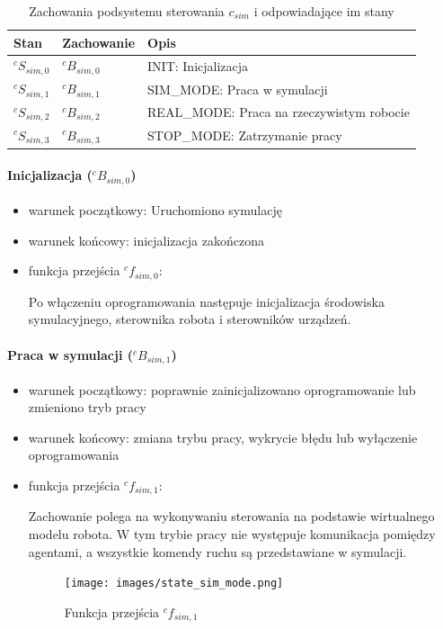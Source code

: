 \documentclass[a4paper, 12pt, twoside]{article}
\begin{document}
\begin{table}[htb!]
\label{behaviour_sim}
\begin{center}
\caption{Zachowania podsystemu sterowania $c_{sim}$ i odpowiadające im stany}
\begin{tabular}{ | l | l | l |}
\hline
 Stan & Zachowanie & Opis \\ 
\hline
 $^cS_{sim,0}$ & $^cB_{sim,0}$ & INIT: Inicjalizacja  \\ 
\hline
 $^cS_{sim,1}$ & $^cB_{sim,1}$ & SIM\_MODE: Praca w symulacji \\
\hline
 $^cS_{sim,2}$ & $^cB_{sim,2}$ & REAL\_MODE: Praca na rzeczywistym robocie \\
\hline
 $^cS_{sim,3}$ & $^cB_{sim,3}$ & STOP\_MODE: Zatrzymanie pracy \\
\hline
\end{tabular}
\end{center}
\end{table}

\newpage
\paragraph{Inicjalizacja ($^cB_{sim,0}$)}

\begin{itemize}
\item warunek początkowy: Uruchomiono symulację
\item warunek końcowy: inicjalizacja zakończona
\item funkcja przejścia $^cf_{sim,0}$:

Po włączeniu oprogramowania następuje inicjalizacja środowiska symulacyjnego, sterownika robota i sterowników urządzeń.

\end{itemize}

\paragraph{Praca w symulacji ($^cB_{sim,1}$)}

\begin{itemize}
\item warunek początkowy: poprawnie zainicjalizowano oprogramowanie lub zmieniono tryb pracy
\item warunek końcowy: zmiana trybu pracy, wykrycie błędu lub wyłączenie oprogramowania
\item funkcja przejścia $^cf_{sim,1}$:

Zachowanie polega na wykonywaniu sterowania na podstawie wirtualnego modelu robota. W tym trybie pracy nie występuje komunikacja pomiędzy agentami, a wszystkie komendy ruchu są przedstawiane w symulacji.

\begin{figure}[hbt!]
\centering
\texttt{[image: images/state\_sim\_mode.png]}
\caption{Funkcja przejścia $^cf_{sim,1}$ }
\label{fig:state_sim_mode}
\end{figure}

\end{itemize}
\end{document}
